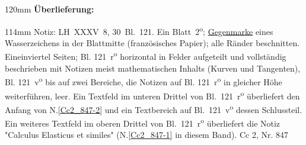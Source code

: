 \begin{ledgroupsized}[r]{120mm}
\footnotesize
\pstart
\noindent\textbf{Überlieferung:}
\pend
\end{ledgroupsized}
\begin{ledgroupsized}[r]{114mm}
\footnotesize
\pstart
\parindent -6mm
%
Notiz:
LH~XXXV~8, 30~Bl.~121. 
Ein Blatt~2\textsuperscript{o};
\href{\Scan{LH_35_08_30_121wz}}%
{Gegenmarke} eines Wasserzeichens in der Blattmitte (französisches Papier);
alle Ränder beschnitten.
Eineinviertel Seiten; 
Bl. 121~r\textsuperscript{o} horizontal in Felder aufgeteilt und vollständig beschrieben
mit Notizen meist mathematischen Inhalts (Kurven und Tangenten), 
Bl. 121~v\textsuperscript{o} bis auf zwei Bereiche, die Notizen auf Bl. 121~r\textsuperscript{o} in gleicher Höhe weiterführen, leer.
Ein Textfeld im unteren Drittel von Bl.~121~r\textsuperscript{o} überliefert den Anfang von N.\;\ref{Cc2_847-2} und ein Textbereich auf Bl.~121~v\textsuperscript{o} dessen Schlussteil.
Ein weiteres Textfeld im oberen Drittel von Bl.~121~r\textsuperscript{o} überliefert die Notiz "Calculus Elasticus et similes" (N.\;\ref{Cc2_847-1} in diesem Band).
\pend
\pstart
\noindent
Cc 2, Nr. 847
\pend
\end{ledgroupsized}
\vspace{5mm}
